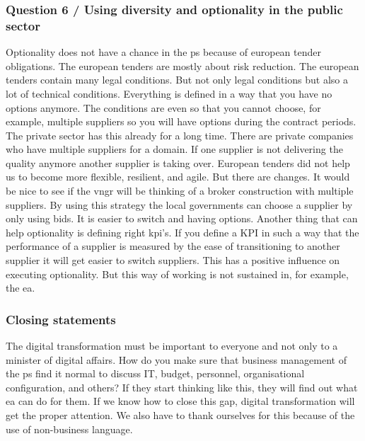 \subsubsection{Question 6 / Using diversity and optionality in the public sector}
Optionality does not have a chance in the \gls{ps} because of european tender obligations. The european tenders are mostly about risk reduction. The european tenders contain many legal conditions. But not only legal conditions but also a lot of technical conditions. Everything is defined in a way that you have no options anymore. The conditions are even so that you cannot choose, for example, multiple suppliers so you will have options during the contract periods. The private sector has this already for a long time. There are private companies who have multiple suppliers for a domain. If one supplier is not delivering the quality anymore another supplier is taking over. European tenders did not help us to become more flexible, resilient, and agile. But there are changes. It would be nice to see if the \acrfull{vngr} will be thinking of a broker construction with multiple suppliers. By using this strategy the local governments can choose a supplier by only using bids. It is easier to switch and having options. Another thing that can help optionality is defining right \acrfull{kpi}'s. If you define a KPI in such a way that the performance of a supplier is measured by the ease of transitioning to another supplier it will get easier to switch suppliers. This has a positive influence on executing optionality. But this way of working is not sustained in, for example, the \acrshort{ea}.
\subsubsection{Closing statements}
The digital transformation must be important to everyone and not only to a minister of digital affairs. How do you make sure that business management of the \gls{ps} find it normal to discuss IT, budget, personnel, organisational configuration, and others? If they start thinking like this, they will find out what \acrshort{ea} can do for them. If we know how to close this gap, digital transformation will get the proper attention. We also have to thank ourselves for this because of the use of non-business language.
